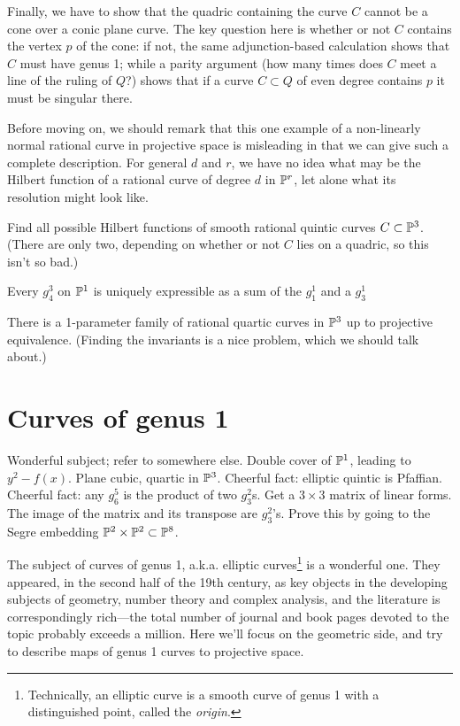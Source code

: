 Finally, we have to show that the quadric containing the curve $C$ cannot be a cone over a conic plane curve. The key question here is whether or not $C$ contains the vertex $p$ of the cone: if not, the same adjunction-based calculation shows that $C$ must have genus 1; while a parity argument (how many times does $C$ meet a line of the ruling of $Q$?) shows that if a curve $C \subset Q$ of even degree contains $p$ it must be singular there.

Before moving on, we should remark that this one example of a non-linearly normal rational curve in projective space is misleading in that we can give such a complete description. For general $d$ and $r$, we have no idea what may be the Hilbert function of a rational curve of degree $d$ in ${\mathbb P}^r$, let alone what its resolution might look like.


\begin{exercise}
Find all possible Hilbert functions of smooth rational quintic  curves $C \subset {\mathbb P}^3$. (There are only two, depending on whether or not $C$ lies on a quadric, so this isn't so bad.)
\end{exercise}

\begin{exercise}
Every $g^3_4$ on ${\mathbb P}^1$ is uniquely expressible as a sum of the $g_1^1$ and a $g^1_3$
\end{exercise}

\begin{exercise}
There is a 1-parameter family of rational quartic curves in ${\mathbb P}^3$ up to projective equivalence. (Finding the invariants is a nice problem, which we should talk about.)
\end{exercise}


\section{Curves of genus 1}

Wonderful subject; refer to somewhere else. Double cover of ${\mathbb P}^1$, leading to $y^2 - f(x)$. Plane cubic, quartic in ${\mathbb P}^3$. Cheerful fact:  elliptic quintic is Pfaffian. Cheerful fact: any $g^5_6$ is the product of two $g^2_3$s. Get a $3\times 3$ matrix of linear forms. The image of the matrix and its transpose are $g^2_3$'s. Prove this by going to the Segre embedding ${\mathbb P}^2\times {\mathbb P}^2 \subset{\mathbb P}^8$.

The subject of curves of genus 1, a.k.a. elliptic curves\footnote{Technically, an elliptic curve is a smooth curve of genus 1 with a distinguished point, called the \emph{origin}.} is a wonderful one. They appeared, in the second half of the 19th century, as key objects in the developing subjects of geometry, number theory and complex analysis, and the literature is correspondingly rich---the total number of journal and book pages devoted to the topic probably exceeds a million. Here we'll focus on the geometric side, and try to describe maps of genus 1 curves to projective space.

